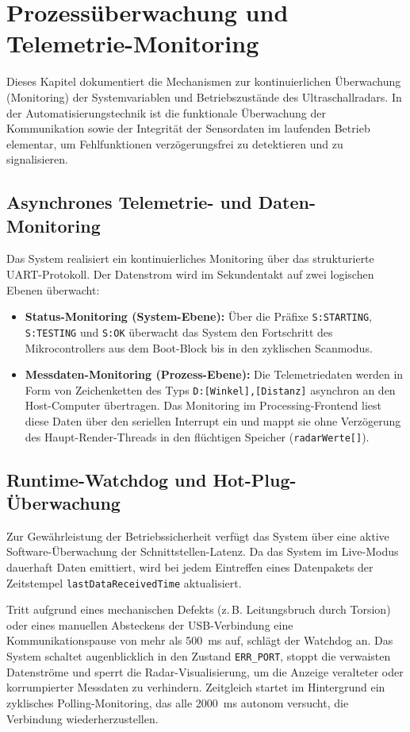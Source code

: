 %
%
%


\chapter{Prozessüberwachung und Telemetrie-Monitoring}
\label{chap:Monitoring_System}

Dieses Kapitel dokumentiert die Mechanismen zur kontinuierlichen Überwachung (Monitoring) der Systemvariablen und Betriebszustände des Ultraschallradars. In der Automatisierungstechnik ist die funktionale Überwachung der Kommunikation sowie der Integrität der Sensordaten im laufenden Betrieb elementar, um Fehlfunktionen verzögerungsfrei zu detektieren und zu signalisieren.

\section{Asynchrones Telemetrie- und Daten-Monitoring}
Das System realisiert ein kontinuierliches Monitoring über das strukturierte UART-Protokoll. Der Datenstrom wird im Sekundentakt auf zwei logischen Ebenen überwacht:
\begin{itemize}
	\item \textbf{Status-Monitoring (System-Ebene):} Über die Präfixe \texttt{S:STARTING}, \texttt{S:TESTING} und \texttt{S:OK} überwacht das System den Fortschritt des Mikrocontrollers aus dem Boot-Block bis in den zyklischen Scanmodus.
	\item \textbf{Messdaten-Monitoring (Prozess-Ebene):} Die Telemetriedaten werden in Form von Zeichenketten des Typs \texttt{D:[Winkel],[Distanz]} asynchron an den Host-Computer übertragen. Das Monitoring im Processing-Frontend liest diese Daten über den seriellen Interrupt  ein und mappt sie ohne Verzögerung des Haupt-Render-Threads in den flüchtigen Speicher (\texttt{radarWerte[]}).
\end{itemize}

\section{Runtime-Watchdog und Hot-Plug-Überwachung}
Zur Gewährleistung der Betriebssicherheit verfügt das System über eine aktive Software-Überwachung der Schnittstellen-Latenz. Da das System im Live-Modus dauerhaft Daten emittiert, wird bei jedem Eintreffen eines Datenpakets der Zeitstempel \texttt{lastDataReceivedTime} aktualisiert. 

Tritt aufgrund eines mechanischen Defekts (z.\,B. Leitungsbruch durch Torsion) oder eines manuellen Absteckens der USB-Verbindung eine Kommunikationspause von mehr als 500~ms auf, schlägt der Watchdog an. Das System schaltet augenblicklich in den Zustand \texttt{ERR\_PORT}, stoppt die verwaisten Datenströme und sperrt die Radar-Visualisierung, um die Anzeige veralteter oder korrumpierter Messdaten zu verhindern. Zeitgleich startet im Hintergrund ein zyklisches Polling-Monitoring, das alle 2000~ms autonom versucht, die Verbindung wiederherzustellen.